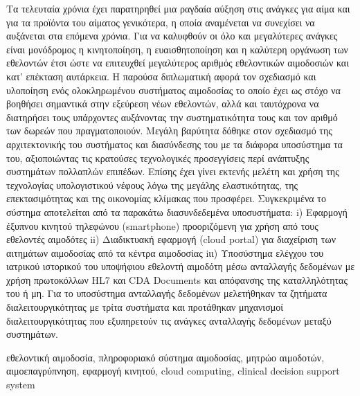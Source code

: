 \begin{abstractgr}
	Τα τελευταία χρόνια έχει παρατηρηθεί μια ραγδαία αύξηση στις ανάγκες για αίμα και για τα προϊόντα του αίματος γενικότερα, η οποία αναμένεται να συνεχίσει να αυξάνεται στα επόμενα χρόνια. Για να καλυφθούν οι όλο και μεγαλύτερες ανάγκες είναι μονόδρομος η κινητοποίηση, η ευαισθητοποίηση και η καλύτερη οργάνωση των εθελοντών έτσι ώστε να επιτευχθεί μεγαλύτερος αριθμός εθελοντικών αιμοδοσιών και κατ' επέκταση αυτάρκεια. Η παρούσα διπλωματική αφορά τον σχεδιασμό και υλοποίηση ενός ολοκληρωμένου συστήματος αιμοδοσίας το οποίο έχει ως στόχο να βοηθήσει σημαντικά στην εξεύρεση νέων εθελοντών, αλλά και ταυτόχρονα να διατηρήσει τους υπάρχοντες αυξάνοντας την συστηματικότητα τους και τον αριθμό των δωρεών που πραγματοποιούν. Μεγάλη βαρύτητα δόθηκε στον σχεδιασμό της αρχιτεκτονικής του συστήματος και διασύνδεσης του με τα διάφορα υποσύστημα τα του, αξιοποιώντας τις κρατούσες
τεχνολογικές προσεγγίσεις περί ανάπτυξης συστημάτων πολλαπλών επιπέδων. Επίσης έχει γίνει εκτενής μελέτη και χρήση της τεχνολογίας υπολογιστικού νέφους λόγω της μεγάλης ελαστικότητας, της επεκτασιμότητας και της οικονομίας κλίμακας που προσφέρει.  Συγκεκριμένα το σύστημα αποτελείται από τα παρακάτω διασυνδεδεμένα υποσυστήματα: i) Εφαρμογή έξυπνου κινητού τηλεφώνου (smartphone) προοριζόμενη για χρήση από τους εθελοντές αιμοδότες ii) Διαδικτυακή εφαρμογή (cloud portal) για διαχείριση των αιτημάτων αιμοδοσίας από τα κέντρα αιμοδοσίας  iιι) Υποσύστημα ελέγχου του ιατρικού ιστορικού  του υποψήφιου εθελοντή αιμοδότη μέσω ανταλλαγής δεδομένων με χρήση πρωτοκόλλων HL7 και CDA Documents και απόφανσης της καταλληλότητας του ή μη. Για το υποσύστημα ανταλλαγής δεδομένων μελετήθηκαν τα ζητήματα διαλειτουργικότητας με τρίτα συστήματα και προτάθηκαν μηχανισμοί διαλειτουργικότητας που εξυπηρετούν τις ανάγκες ανταλλαγής δεδομένων μεταξύ συστημάτων.
    \begin{keywordsgr}
		εθελοντική αιμοδοσία, πληροφοριακό σύστημα αιμοδοσίας, μητρώο αιμοδοτών, αιμοεπαγρύπνηση, εφαρμογή κινητού, cloud computing, clinical decision support system
	\end{keywordsgr}
\end{abstractgr}

\begin{abstracten}
	\begin{keywordsen}
	\end{keywordsen}
\end{abstracten}

